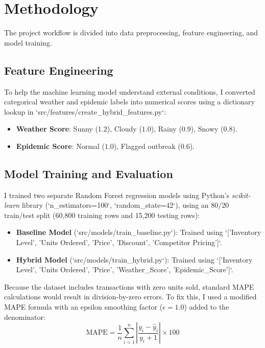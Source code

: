 \documentclass[12pt]{article}
\begin{document}
\section{Methodology}
The project workflow is divided into data preprocessing, feature engineering, and model training.

\subsection{Feature Engineering}
To help the machine learning model understand external conditions, I converted categorical weather and epidemic labels into numerical scores using a dictionary lookup in `src/features/create_hybrid_features.py`:
\begin{itemize}
    \item \textbf{Weather Score}: Sunny ($1.2$), Cloudy ($1.0$), Rainy ($0.9$), Snowy ($0.8$).
    \item \textbf{Epidemic Score}: Normal ($1.0$), Flagged outbreak ($0.6$).
\end{itemize}

\subsection{Model Training and Evaluation}
I trained two separate Random Forest regression models using Python's \textit{scikit-learn} library (`n_estimators=100`, `random_state=42`), using an 80/20 train/test split (60,800 training rows and 15,200 testing rows):
\begin{itemize}
    \item \textbf{Baseline Model} (`src/models/train_baseline.py`): Trained using `['Inventory Level', 'Units Ordered', 'Price', 'Discount', 'Competitor Pricing']`.
    \item \textbf{Hybrid Model} (`src/models/train_hybrid.py`): Trained using `['Inventory Level', 'Units Ordered', 'Price', 'Weather_Score', 'Epidemic_Score']`.
\end{itemize}

Because the dataset includes transactions with zero units sold, standard MAPE calculations would result in division-by-zero errors. To fix this, I used a modified MAPE formula with an epsilon smoothing factor ($\epsilon = 1.0$) added to the denominator:
\begin{equation}
\text{MAPE} = \frac{1}{n} \sum_{i=1}^{n} \left| \frac{y_i - \hat{y}_i}{y_i + 1} \right| \times 100
\end{equation}
\end{document}

